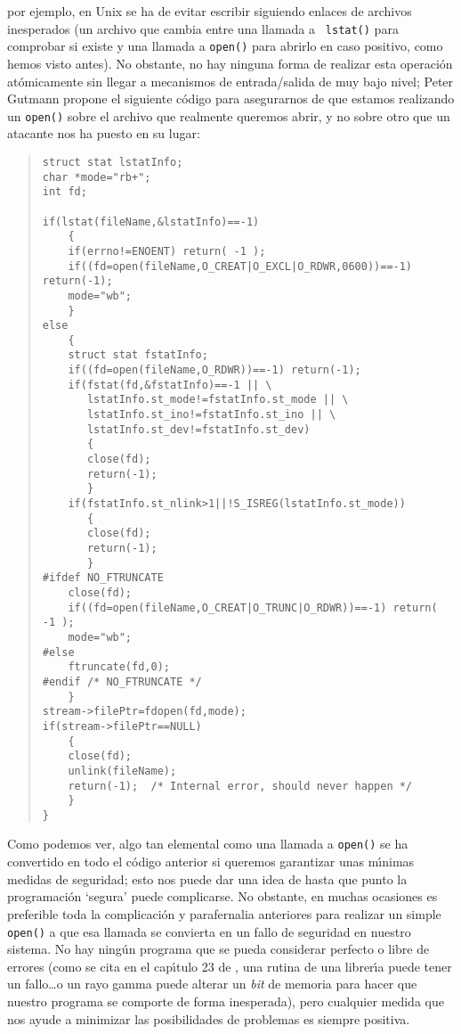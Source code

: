 \begin{itemize}
por ejemplo, en Unix se ha de evitar escribir siguiendo enlaces de archivos
inesperados (un archivo que cambia entre una llamada a {\tt 
lstat()} para comprobar si existe y una llamada a {\tt open()} para abrirlo en
caso positivo, como hemos visto antes). No obstante, no hay ninguna forma de
realizar esta operaci\'on at\'omicamente sin llegar a mecanismos de 
entrada/salida de muy bajo nivel; Peter Gutmann propone el siguiente c\'odigo
para asegurarnos de que estamos realizando un {\tt open()} sobre el archivo que
realmente queremos abrir, y no sobre otro que un atacante nos ha puesto en su
lugar:
\begin{quote}
\begin{verbatim}
struct stat lstatInfo;
char *mode="rb+";
int fd;

if(lstat(fileName,&lstatInfo)==-1)
    {
    if(errno!=ENOENT) return( -1 );
    if((fd=open(fileName,O_CREAT|O_EXCL|O_RDWR,0600))==-1) return(-1);
    mode="wb";
    }
else
    {
    struct stat fstatInfo;
    if((fd=open(fileName,O_RDWR))==-1) return(-1);
    if(fstat(fd,&fstatInfo)==-1 || \
       lstatInfo.st_mode!=fstatInfo.st_mode || \
       lstatInfo.st_ino!=fstatInfo.st_ino || \
       lstatInfo.st_dev!=fstatInfo.st_dev)
       {
       close(fd);
       return(-1);
       }
    if(fstatInfo.st_nlink>1||!S_ISREG(lstatInfo.st_mode))
       {
       close(fd);
       return(-1);
       }
#ifdef NO_FTRUNCATE
    close(fd);
    if((fd=open(fileName,O_CREAT|O_TRUNC|O_RDWR))==-1) return( -1 );
    mode="wb";
#else
    ftruncate(fd,0);
#endif /* NO_FTRUNCATE */
    }
stream->filePtr=fdopen(fd,mode);
if(stream->filePtr==NULL)
    {
    close(fd);
    unlink(fileName);
    return(-1);  /* Internal error, should never happen */
    }
}
\end{verbatim}
\end{quote}
Como podemos ver, algo tan elemental como una llamada a {\tt open()} se ha 
convertido en todo el c\'odigo anterior si queremos garantizar unas m\'{\i}nimas
medidas de seguridad; esto nos puede dar una idea de hasta que punto la 
programaci\'on `segura' puede complicarse. No obstante, en muchas ocasiones es
preferible toda la complicaci\'on y parafernalia anteriores para realizar un 
simple {\tt open()} a que esa llamada se convierta en un fallo de seguridad en
nuestro sistema. No hay ning\'un programa que se pueda considerar perfecto o
libre de errores (como se cita en el cap\'{\i}tulo 23 de \cite{kn:spa96}, una
rutina de una librer\'{\i}a puede tener un fallo\ldots o un rayo gamma puede
alterar un {\it bit} de memoria para hacer que nuestro programa se comporte de
forma inesperada), pero cualquier medida que nos ayude a minimizar las 
posibilidades de problemas es siempre positiva.
\end{itemize}
